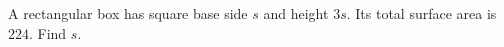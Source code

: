 A rectangular box has square base side $s$ and height $3s$. Its total surface area is $224$. Find $s$.
